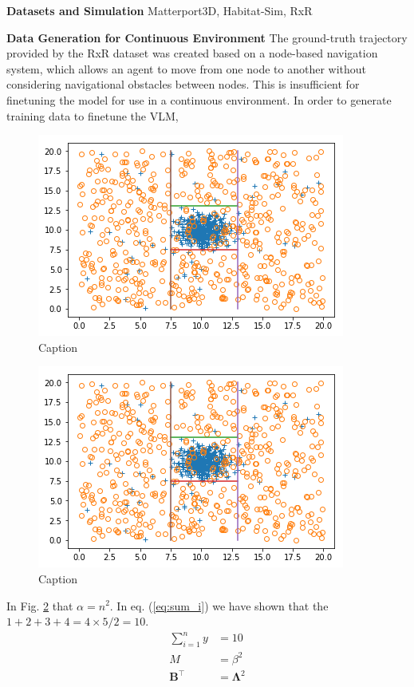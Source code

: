 \documentclass{svproc}
\begin{document}
    \textbf{Datasets and Simulation}  Matterport3D, Habitat-Sim, RxR

    \textbf{Data Generation for Continuous Environment}  The ground-truth trajectory provided by the RxR dataset was created based on a node-based navigation system, which allows an agent to move from one node to another without considering navigational obstacles between nodes. This is insufficient for finetuning the model for use in a continuous environment. In order to generate training data to finetune the VLM, 

    

    \begin{figure}
        \centering
        \includegraphics[scale=.75]{figures/DecisionBoundary.png}
        \caption{Caption}
        \label{fig:fig2}
    \end{figure}

    
    \begin{figure}
        \centering
        \includegraphics[scale=.75]{figures/DecisionBoundary.png}
        \caption{Caption}
        \label{fig:my_label}
    \end{figure}


    
    In Fig. \ref{fig:my_label} that $\alpha = n^2$. In eq. (\ref{eq:sum_i}) we have shown that the $ 1+2+3+4 = 4\times 5 /2=10$.
    \begin{align*}
        \sum_{i=1}^{n} y &= 10 \\
        M &= \beta ^2 \\
        \boldsymbol{B}^\top &= \boldsymbol{\Lambda}^2 \\
    \end{align*}
    
\end{document}

